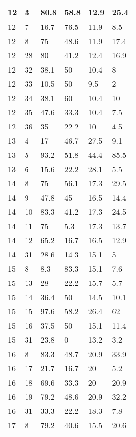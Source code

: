 \begin{longtable}[c]{ | p{2cm} | p{2cm} | p{2cm} | p{2cm} | p{3cm} | p{3cm} | }
	\hline
	\hline
	12 & 3 & 80.8 & 58.8 & 12.9 & 25.4 \\
	\hline
	12 & 7 & 16.7 & 76.5 & 11.9 & 8.5 \\
	\hline
	12 & 8 & 75 & 48.6 & 11.9 & 17.4 \\
	\hline
	12 & 28 & 80 & 41.2 & 12.4 & 16.9 \\
	\hline
	12 & 32 & 38.1 & 50 & 10.4 & 8 \\
	\hline
	12 & 33 & 10.5 & 50 & 9.5 & 2 \\
	\hline
	12 & 34 & 38.1 & 60 & 10.4 & 10 \\
	\hline
	12 & 35 & 47.6 & 33.3 & 10.4 & 7.5 \\
	\hline
	12 & 36 & 35 & 22.2 & 10 & 4.5 \\
	\hline
	\hline
	\hline
	13 & 4 & 17 & 46.7 & 27.5 & 9.1 \\
	\hline
	13 & 5 & 93.2 & 51.8 & 44.4 & 85.5 \\
	\hline
	13 & 6 & 15.6 & 22.2 & 28.1 & 5.5 \\
	\hline
	\hline
	\hline
	14 & 8 & 75 & 56.1 & 17.3 & 29.5 \\
	\hline
	14 & 9 & 47.8 & 45 & 16.5 & 14.4 \\
	\hline
	14 & 10 & 83.3 & 41.2 & 17.3 & 24.5 \\
	\hline
	14 & 11 & 75 & 5.3 & 17.3 & 13.7 \\
	\hline
	14 & 12 & 65.2 & 16.7 & 16.5 & 12.9 \\
	\hline
	14 & 31 & 28.6 & 14.3 & 15.1 & 5 \\
	\hline
	\hline
	\hline
	15 & 8 & 8.3 & 83.3 & 15.1 & 7.6 \\
	\hline
	15 & 13 & 28 & 22.2 & 15.7 & 5.7 \\
	\hline
	15 & 14 & 36.4 & 50 & 14.5 & 10.1 \\
	\hline
	15 & 15 & 97.6 & 58.2 & 26.4 & 62 \\
	\hline
	15 & 16 & 37.5 & 50 & 15.1 & 11.4 \\
	\hline
	15 & 31 & 23.8 & 0 & 13.2 & 3.2 \\
	\hline
	\hline
	\hline
	16 & 8 & 83.3 & 48.7 & 20.9 & 33.9 \\
	\hline
	16 & 17 & 21.7 & 16.7 & 20 & 5.2 \\
	\hline
	16 & 18 & 69.6 & 33.3 & 20 & 20.9 \\
	\hline
	16 & 19 & 79.2 & 48.6 & 20.9 & 32.2 \\
	\hline
	16 & 31 & 33.3 & 22.2 & 18.3 & 7.8 \\
	\hline
	\hline
	\hline
	17 & 8 & 79.2 & 40.6 & 15.5 & 20.6 \\

\end{longtable}

